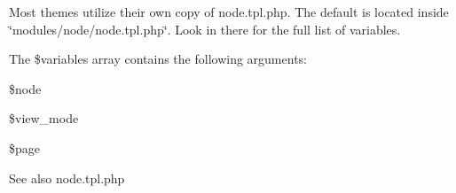 Most themes utilize their own copy of node.tpl.php. The default is located inside \char`\"{}modules/node/node.tpl.php\char`\"{}. Look in there for the full list of variables.

The \$variables array contains the following arguments:
\begin{DoxyItemize}
\item \$node
\item \$view\_\-mode
\item \$page
\end{DoxyItemize}

\begin{DoxySeeAlso}{See also}
node.tpl.php 
\end{DoxySeeAlso}
